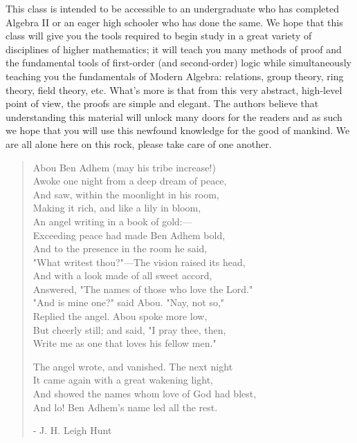 This class is intended to be accessible to an undergraduate who has completed Algebra II or an eager high schooler who has done the same. We hope that this class will give you the tools required to begin study in a great variety of disciplines of higher mathematics; it will teach you many methods of proof and the fundamental tools of first-order (and second-order) logic while simultaneously teaching you the fundamentals of Modern Algebra: relations, group theory, ring theory, field theory, etc. What's more is that from this very abstract, high-level point of view, the proofs are simple and elegant. 
\noindent The authors believe that understanding this material will unlock many doors for the readers and as such we hope that you will use this newfound knowledge for the good of mankind. We are all alone here on this rock, please take care of one another.\steezybreak
\small
\begin{quote}
Abou Ben Adhem (may his tribe increase!)\\
Awoke one night from a deep dream of peace,\\
And saw, within the moonlight in his room,\\
Making it rich, and like a lily in bloom,\\
An angel writing in a book of gold:—\\
Exceeding peace had made Ben Adhem bold,\\
And to the presence in the room he said,\\
"What writest thou?"—The vision raised its head,\\
And with a look made of all sweet accord,\\
Answered, "The names of those who love the Lord."\\
"And is mine one?" said Abou. "Nay, not so,"\\
Replied the angel. Abou spoke more low,\\
But cheerly still; and said, "I pray thee, then,\\
Write me as one that loves his fellow men."\steezybreak

The angel wrote, and vanished. The next night\\
It came again with a great wakening light,\\
And showed the names whom love of God had blest,\\
And lo! Ben Adhem's name led all the rest.\steezybreak

- J. H. Leigh Hunt
\end{quote} 

